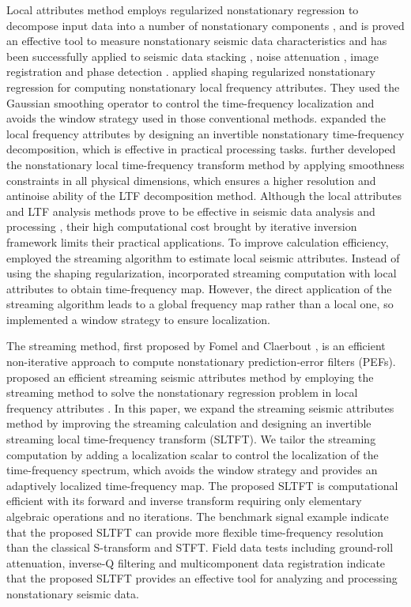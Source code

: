 Local attributes method employs regularized nonstationary regression
to decompose input data into a number of nonstationary
components \cite[]{Fomel07a}, and is proved an effective tool to
measure nonstationary seismic data characteristics and has been
successfully applied to seismic data stacking \cite[]{Liu11b}, noise
attenuation \cite[]{Zheng2022,Liu11b}, image
registration \cite[]{Fomel09b} and phase
detection \cite[]{Fomel10}. \cite{Liu11} applied shaping regularized
nonstationary regression for computing nonstationary local frequency
attributes. They used the Gaussian smoothing operator to control the
time-frequency localization and avoids the window strategy used in
those conventional methods. \cite{Liu13} expanded the local frequency
attributes \cite[]{Liu11} by designing an invertible nonstationary
time-frequency decomposition, which is effective in practical
processing tasks. \cite{chen2021} further developed the nonstationary
local time-frequency transform method by applying smoothness
constraints in all physical dimensions, which ensures a higher
resolution and antinoise ability of the LTF decomposition
method. Although the local attributes and LTF analysis methods prove
to be effective in seismic data analysis and
processing \cite[]{Liu11,Liu13,chen2021}, their high computational
cost brought by iterative inversion framework limits their practical
applications. To improve calculation efficiency, \cite{Geng24}
employed the streaming algorithm \cite[]{Fomel16} to estimate local
seismic attributes. Instead of using the shaping
regularization, \cite{Geng24} incorporated streaming computation with
local attributes to obtain time-frequency map. However, the direct
application of the streaming algorithm leads to a global frequency map
rather than a local one, so \cite{Geng24} implemented a window
strategy to ensure localization.


The streaming method, first proposed by Fomel and
Claerbout \cite[]{Fomel16,Fomel24}, is an efficient non-iterative
approach to compute nonstationary prediction-error filters
(PEFs). \cite{Geng24} proposed an efficient streaming seismic
attributes method by employing the streaming method to solve the
nonstationary regression problem in local frequency
attributes \cite[]{Liu11}. In this paper, we expand the streaming
seismic attributes method \cite[]{Geng24} by improving the streaming
calculation and designing an invertible streaming local time-frequency
transform (SLTFT). We tailor the streaming computation by adding a
localization scalar to control the localization of the time-frequency
spectrum, which avoids the window strategy and provides an adaptively
localized time-frequency map. The proposed SLTFT is computational
efficient with its forward and inverse transform requiring only
elementary algebraic operations and no iterations. The benchmark
signal example indicate that the proposed SLTFT can provide more
flexible time-frequency resolution than the classical S-transform and
STFT. Field data tests including ground-roll attenuation, inverse-Q
filtering and multicomponent data registration indicate that the
proposed SLTFT provides an effective tool for analyzing and processing
nonstationary seismic data.

